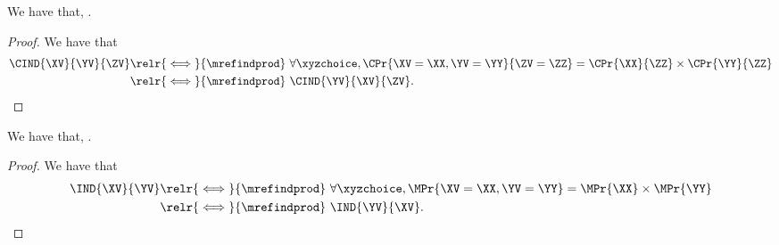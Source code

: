 \begin{proposition}
  We have that, \indsymmdefa.%
\end{proposition}

\begin{proof}
  We have that
  \begin{align*}
    \CIND{\XV}{\YV}{\ZV} 
    \relr {\iff} {\mrefindprod} &\ 
    \forall \xyzchoice,
    \CPr{\XV = \XX, \YV = \YY}{\ZV = \ZZ} = 
    \CPr{\XX}{\ZZ}
    \times
    \CPr{\YY}{\ZZ}\\
    \relr {\iff} {\mrefindprod} &\ 
    \CIND{\YV}{\XV}{\ZV}.
  \end{align*}%
\end{proof}

\begin{proposition}
  We have that, \indsymmdefb.%
\end{proposition}

\begin{proof}
  We have that
  \begin{align*}
    \IND{\XV}{\YV} 
    \relr {\iff} {\mrefindprod} &\ 
    \forall \xyzchoice,
    \MPr{\XV = \XX, \YV = \YY} = 
    \MPr{\XX}
    \times
    \MPr{\YY}\\
    \relr {\iff} {\mrefindprod} &\ 
    \IND{\YV}{\XV}.
  \end{align*}%
\end{proof}

